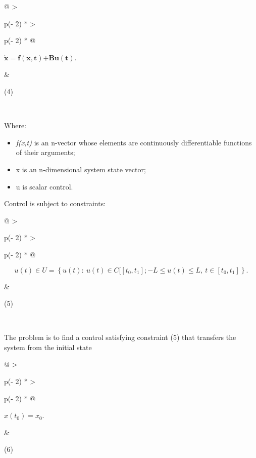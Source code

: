 \begin{longtable}[]{@{}
  >{\raggedright\arraybackslash}p{(\columnwidth - 2\tabcolsep) * }
  >{\raggedright\arraybackslash}p{(\columnwidth - 2\tabcolsep) * }@{}}
\toprule\noalign{}
\begin{minipage}[b]{\linewidth}\raggedright
\(\dot{\mathbf{x}}\mathbf{= f}\left( \mathbf{x,t} \right)\mathbf{+ Bu(t)}\).
\end{minipage} & \begin{minipage}[b]{\linewidth}\raggedright
(4)
\end{minipage} \\
\midrule\noalign{}
\endhead
\bottomrule\noalign{}
\endlastfoot
\end{longtable}

Where:

\begin{itemize}
\item
  \emph{f(x,t)} is an n-vector whose elements are continuously
  differentiable functions of their arguments;
\item
  x is an n-dimensional system state vector;
\item
  u is scalar control.
\end{itemize}

Control is subject to constraints:

\begin{longtable}[]{@{}
  >{\raggedright\arraybackslash}p{(\columnwidth - 2\tabcolsep) * }
  >{\raggedright\arraybackslash}p{(\columnwidth - 2\tabcolsep) * }@{}}
\toprule\noalign{}
\begin{minipage}[b]{\linewidth}\raggedright
\[u(t) \in U = \left\{ u(t):\ u(t) \in C\lbrack\left\lbrack t_{0},t_{1} \right\rbrack; - L \leq u(t) \leq L,\ t \in \left\lbrack t_{0},t_{1} \right\rbrack \right\}.\]
\end{minipage} & \begin{minipage}[b]{\linewidth}\raggedright
(5)
\end{minipage} \\
\midrule\noalign{}
\endhead
\bottomrule\noalign{}
\endlastfoot
\end{longtable}

The problem is to find a control satisfying constraint (5) that
transfers the system from the initial state

\begin{longtable}[]{@{}
  >{\raggedright\arraybackslash}p{(\columnwidth - 2\tabcolsep) * }
  >{\raggedright\arraybackslash}p{(\columnwidth - 2\tabcolsep) * }@{}}
\toprule\noalign{}
\begin{minipage}[b]{\linewidth}\raggedright
\(x\left( t_{0} \right) = x_{0}\).
\end{minipage} & \begin{minipage}[b]{\linewidth}\raggedright
(6)
\end{minipage} \\
\midrule\noalign{}
\endhead
\bottomrule\noalign{}
\endlastfoot
\end{longtable}

